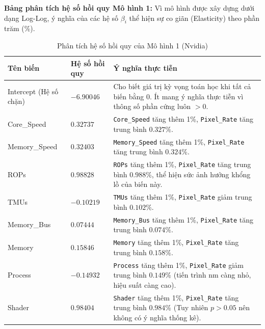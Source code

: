 \textbf{Bảng phân tích hệ số hồi quy Mô hình 1:} Vì mô hình được xây dựng dưới dạng Log-Log, ý nghĩa của các hệ số $\beta_i$ thể hiện sự co giãn (Elasticity) theo phần trăm (\%).
\begin{table}[H]
    \centering
    \caption{Phân tích hệ số hồi quy của Mô hình 1 (Nvidia)}
    \begin{tabular}{|l|p{2.5cm}|p{8.5cm}|}
        \hline
        \textbf{Tên biến} & \textbf{Hệ số hồi quy} & \textbf{Ý nghĩa thực tiễn} \\ \hline
        Intercept (Hệ số chặn) & $-6.90046$ & Cho biết giá trị kỳ vọng toán học khi tất cả biến bằng 0. Ít mang ý nghĩa thực tiễn vì thông số phần cứng luôn $>0$. \\ \hline
        Core\_Speed & $0.32737$ & \texttt{Core\_Speed} tăng thêm 1\%, \texttt{Pixel\_Rate} tăng trung bình $0.327\%$. \\ \hline
        Memory\_Speed & $0.32403$ & \texttt{Memory\_Speed} tăng thêm 1\%, \texttt{Pixel\_Rate} tăng trung bình $0.324\%$. \\ \hline
        ROPs & $0.98828$ & \texttt{ROPs} tăng thêm 1\%, \texttt{Pixel\_Rate} tăng trung bình $0.988\%$, thể hiện sức ảnh hưởng khổng lồ của biến này. \\ \hline
        TMUs & $-0.10219$ & \texttt{TMUs} tăng thêm 1\%, \texttt{Pixel\_Rate} giảm trung bình $0.102\%$. \\ \hline
        Memory\_Bus & $0.07444$ & \texttt{Memory\_Bus} tăng thêm 1\%, \texttt{Pixel\_Rate} tăng trung bình $0.074\%$. \\ \hline
        Memory & $0.15846$ & \texttt{Memory} tăng thêm 1\%, \texttt{Pixel\_Rate} tăng trung bình $0.158\%$. \\ \hline
        Process & $-0.14932$ & \texttt{Process} tăng thêm 1\%, \texttt{Pixel\_Rate} giảm trung bình $0.149\%$ (tiến trình nm càng nhỏ, hiệu suất càng cao). \\ \hline
        Shader & $0.98404$ & \texttt{Shader} tăng thêm 1\%, \texttt{Pixel\_Rate} tăng trung bình $0.984\%$ (Tuy nhiên $p > 0.05$ nên không có ý nghĩa thống kê). \\ \hline
    \end{tabular}
    \label{tab:model1_coef}
\end{table}

